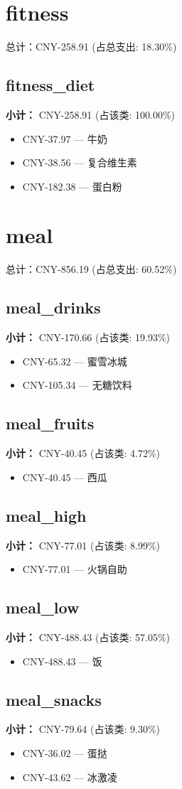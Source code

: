 \documentclass[12pt]{article}
\begin{document}
\section*{fitness}
总计：CNY-258.91 	 (占总支出: 18.30\%)

\subsection*{fitness\_diet}
\textbf{小计：} CNY-258.91 (占该类: 100.00\%)
\begin{itemize}
    \item CNY-37.97 --- 牛奶
    \item CNY-38.56 --- 复合维生素
    \item CNY-182.38 --- 蛋白粉
\end{itemize}
\section*{meal}
总计：CNY-856.19 	 (占总支出: 60.52\%)

\subsection*{meal\_drinks}
\textbf{小计：} CNY-170.66 (占该类: 19.93\%)
\begin{itemize}
    \item CNY-65.32 --- 蜜雪冰城
    \item CNY-105.34 --- 无糖饮料
\end{itemize}
\subsection*{meal\_fruits}
\textbf{小计：} CNY-40.45 (占该类: 4.72\%)
\begin{itemize}
    \item CNY-40.45 --- 西瓜
\end{itemize}
\subsection*{meal\_high}
\textbf{小计：} CNY-77.01 (占该类: 8.99\%)
\begin{itemize}
    \item CNY-77.01 --- 火锅自助
\end{itemize}
\subsection*{meal\_low}
\textbf{小计：} CNY-488.43 (占该类: 57.05\%)
\begin{itemize}
    \item CNY-488.43 --- 饭
\end{itemize}
\subsection*{meal\_snacks}
\textbf{小计：} CNY-79.64 (占该类: 9.30\%)
\begin{itemize}
    \item CNY-36.02 --- 蛋挞
    \item CNY-43.62 --- 冰激凌
\end{itemize}
\end{document}

